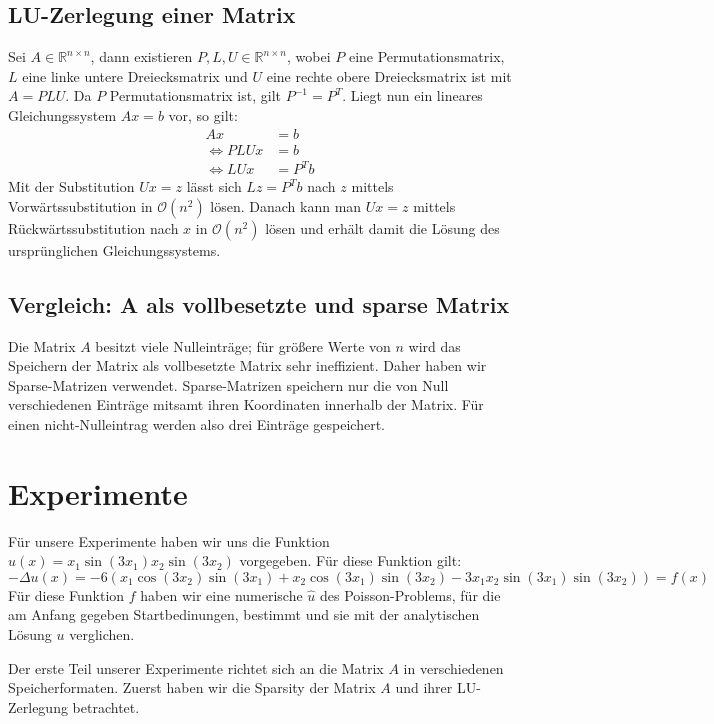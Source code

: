 \documentclass{scrartcl}
\theoremstyle{remark}
\begin{document}
\subsection{LU-Zerlegung einer Matrix}
Sei \(A \in \mathbb{R}^{n \times n}\), dann existieren \(P, L, U \in \mathbb{R}^{n \times n}\), 
wobei \(P\) eine Permutationsmatrix, \(L\) eine linke untere Dreiecksmatrix und \(U\) eine rechte obere
Dreiecksmatrix ist mit \(A = PLU\).  \cite{LU}
Da \(P\) Permutationsmatrix ist, gilt \(P^{-1} = P^{T}\).
Liegt nun ein lineares Gleichungssystem \(Ax = b\) vor, so gilt:
\begin{align*}
  Ax &= b \\
  \iff PLUx &= b \\
  \iff LUx  &= P^{T}b
\end{align*}
Mit der Substitution \(Ux = z\) lässt sich \(Lz = P^{T}b\) nach \(z\) mittels Vorwärtssubstitution in \(\mathcal{O}(n^{2})\) lösen.
Danach kann man \(Ux = z\) mittels Rückwärtssubstitution nach \(x\) in \(\mathcal{O}(n^{2})\) lösen und erhält damit die Lösung des
ursprünglichen Gleichungssystems.

\subsection{Vergleich: A als vollbesetzte und sparse Matrix}
Die Matrix \(A\) besitzt viele Nulleinträge; für größere Werte von \(n\) wird das Speichern
der Matrix als vollbesetzte Matrix sehr ineffizient. Daher haben wir Sparse-Matrizen verwendet.
Sparse-Matrizen speichern nur die von Null verschiedenen Einträge mitsamt ihren Koordinaten innerhalb 
der Matrix. Für einen nicht-Nulleintrag werden also drei Einträge gespeichert.  



\section{Experimente}
Für unsere Experimente haben wir uns die Funktion \(u(x) = x_{1}\sin(3x_{1})x_{2}\sin(3x_{2})\) vorgegeben. Für diese Funktion gilt:
\[-\Delta u(x) = -6(x_{1}\cos(3x_{2})\sin(3x_{1}) + x_{2}\cos(3x_{1})\sin(3x_{2}) - 3x_{1}x_{2}\sin(3x_{1})\sin(3x_{2})) = f(x)\] 
Für diese Funktion \(f\) haben wir eine numerische \(\hat{u}\) des Poisson-Problems, für die am Anfang gegeben Startbedinungen, bestimmt und sie 
mit der analytischen Lösung \(u\) verglichen.

Der erste Teil unserer Experimente richtet sich an die Matrix \(A\) in verschiedenen Speicherformaten.
Zuerst haben wir die Sparsity der Matrix \(A\) und ihrer LU-Zerlegung betrachtet.
\end{document}
